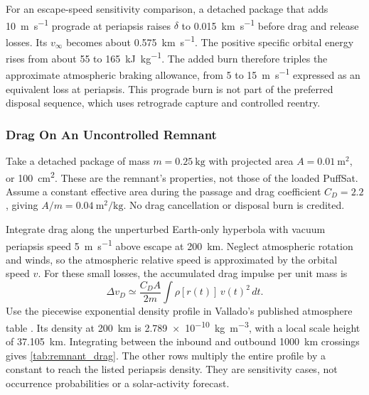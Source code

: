 \documentclass{article}
\newcommand{\deltav}{\Delta v}
\begin{document}
For an escape-speed sensitivity comparison, a detached package that adds \SI{10}{\meter\per\second} prograde at periapsis raises $\delta$ to \SI{0.015}{\kilo\meter\per\second} before drag and release losses. Its $v_\infty$ becomes about \SI{0.575}{\kilo\meter\per\second}. The positive specific orbital energy rises from about \SI{55}{} to \SI{165}{\kilo\joule\per\kilo\gram}. The added burn therefore triples the approximate atmospheric braking allowance, from \SI{5}{} to \SI{15}{\meter\per\second} expressed as an equivalent loss at periapsis. This prograde burn is not part of the preferred disposal sequence, which uses retrograde capture and controlled reentry.

\subsubsection{Drag On An Uncontrolled Remnant}\label{sec:remnant_drag}
Take a detached package of mass $m=\SI{0.25}{\kilogram}$ with projected area $A=\SI{0.01}{\square\meter}$, or \SI{100}{\square\centi\meter}. These are the remnant's properties, not those of the loaded PuffSat. Assume a constant effective area during the passage and drag coefficient $C_D=2.2$, giving $A/m=\SI{0.04}{\square\meter\per\kilogram}$. No drag cancellation or disposal burn is credited.

Integrate drag along the unperturbed Earth-only hyperbola with vacuum periapsis speed \SI{5}{\meter\per\second} above escape at \SI{200}{\kilo\meter}. Neglect atmospheric rotation and winds, so the atmospheric relative speed is approximated by the orbital speed $v$. For these small losses, the accumulated drag impulse per unit mass is
\begin{equation}
\deltav_D \simeq \frac{C_D A}{2m}\int \rho[r(t)]\,v(t)^2\,dt.
\end{equation}
Use the piecewise exponential density profile in Vallado's published atmosphere table \cite{vallado_atmosexp}. Its density at \SI{200}{\kilo\meter} is \SI{2.789e-10}{\kilogram\per\cubic\meter}, with a local scale height of \SI{37.105}{\kilo\meter}. Integrating between the inbound and outbound \SI{1000}{\kilo\meter} crossings gives \autoref{tab:remnant_drag}. The other rows multiply the entire profile by a constant to reach the listed periapsis density. They are sensitivity cases, not occurrence probabilities or a solar-activity forecast.
\end{document}
